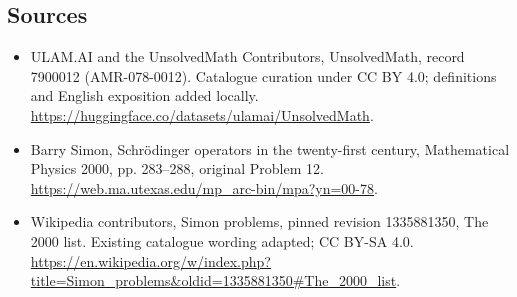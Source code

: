 \documentclass[11pt]{article}
\begin{document}
\subsection{Sources}
\begin{itemize}
\item[\hypertarget{source:7900012:1}{S1}] ULAM.AI and the UnsolvedMath Contributors, UnsolvedMath, record 7900012 (AMR-078-0012). Catalogue curation under CC BY 4.0; definitions and English exposition added locally.
\url{https://huggingface.co/datasets/ulamai/UnsolvedMath}.
\item[\hypertarget{source:7900012:2}{S2}] Barry Simon, Schrödinger operators in the twenty-first century, Mathematical Physics 2000, pp. 283–288, original Problem 12.
\url{https://web.ma.utexas.edu/mp_arc-bin/mpa?yn=00-78}.
\item[\hypertarget{source:7900012:3}{S3}] Wikipedia contributors, Simon problems, pinned revision 1335881350, The 2000 list. Existing catalogue wording adapted; CC BY-SA 4.0.
\url{https://en.wikipedia.org/w/index.php?title=Simon_problems&oldid=1335881350#The_2000_list}.
\end{itemize}
\label{end:7900012}
\end{document}
